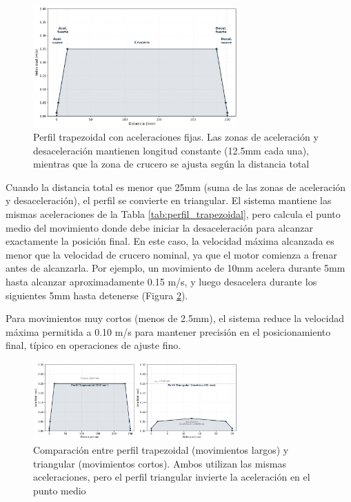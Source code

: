 \begin{figure}[H]
    \centering
    \includegraphics[width=0.7\textwidth]{imagenes/perfil_trapezoidal_velocidad.png}
    \caption{Perfil trapezoidal con aceleraciones fijas. Las zonas de aceleración y desaceleración mantienen longitud constante (12.5mm cada una), mientras que la zona de crucero se ajusta según la distancia total}
    \label{fig:perfil_trapezoidal}
\end{figure}

Cuando la distancia total es menor que 25mm (suma de las zonas de aceleración y desaceleración), el perfil se convierte en triangular. El sistema mantiene las mismas aceleraciones de la Tabla \ref{tab:perfil_trapezoidal}, pero calcula el punto medio del movimiento donde debe iniciar la desaceleración para alcanzar exactamente la posición final. En este caso, la velocidad máxima alcanzada es menor que la velocidad de crucero nominal, ya que el motor comienza a frenar antes de alcanzarla. Por ejemplo, un movimiento de 10mm acelera durante 5mm hasta alcanzar aproximadamente 0.15 m/s, y luego desacelera durante los siguientes 5mm hasta detenerse (Figura \ref{fig:perfil_comparacion}).

Para movimientos muy cortos (menos de 2.5mm), el sistema reduce la velocidad máxima permitida a 0.10 m/s para mantener precisión en el posicionamiento final, típico en operaciones de ajuste fino.

\begin{figure}[H]
    \centering
    \includegraphics[width=0.7\textwidth]{imagenes/perfil_trapezoidal_triangular.png}
    \caption{Comparación entre perfil trapezoidal (movimientos largos) y triangular (movimientos cortos). Ambos utilizan las mismas aceleraciones, pero el perfil triangular invierte la aceleración en el punto medio}
    \label{fig:perfil_comparacion}
\end{figure}

